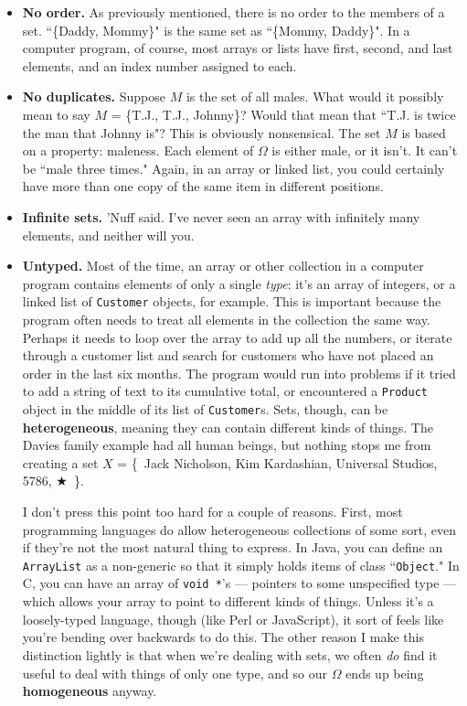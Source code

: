 \begin{itemize}

\item \textbf{No order.}  As previously mentioned,
there is no order to the members of a set. ``\{Daddy, Mommy\}" is the same
set as ``\{Mommy, Daddy\}". In a computer program, of course, most arrays
or lists have first, second, and last elements, and an index number
assigned to each.

\item \textbf{No duplicates.}  Suppose $M$ is
the set of all males. What would it possibly mean to say $M$ = \{T.J.,
T.J., Johnny\}?  Would that mean that ``T.J. is twice the man that Johnny
is"? This is obviously nonsensical. The set $M$ is based on a property:
maleness. Each element of $\Omega$ is either male, or it isn't. It can't be
``male three times." Again, in an array or linked list, you could certainly
have more than one copy of the same item in different positions.

\item \textbf{Infinite sets.} 'Nuff said. I've never seen an array with
infinitely many elements, and neither will you. 

\item \textbf{Untyped.}   
Most of the time, an array or other collection in a computer program contains
elements of only a single \textit{type}: it's an array of integers, or a
linked list of \texttt{Customer} objects, for example. This is important
because the program often needs to treat all elements in the collection the
same way. Perhaps it needs to loop over the array to add up all the numbers,
or iterate through a customer list and search for customers who have not
placed an order in the last six months. The program would run into problems if
it tried to add a string of text to its cumulative total, or encountered a
\texttt{Product} object in the middle of its list of \texttt{Customer}s. Sets,
though, can be \textbf{heterogeneous}, meaning they can contain different
kinds of things. The Davies family example had all human beings, but nothing
stops me from creating a set $X$ = \{~Jack Nicholson, Kim Kardashian,
Universal Studios, 5786, $\bigstar$~\}.

I don't press this point too hard for a couple of reasons. First, most
programming languages do allow heterogeneous collections of some sort, even if
they're not the most natural thing to express. In Java, you can define an
\texttt{ArrayList} as a non-generic so that it simply holds items of class
``\texttt{Object}." In C, you can have an array of \texttt{void *}'s ---
pointers to some unspecified type --- which allows your array to point to
different kinds of things. Unless it's a loosely-typed language,
 though (like Perl or JavaScript), it sort of
feels like you're bending over backwards to do this. The other reason I make
this distinction lightly is that when we're dealing with sets, we often
\textit{do} find it useful to deal with things of only one type, and so our
$\Omega$ ends up being \textbf{homogeneous}  anyway.


\end{itemize}
